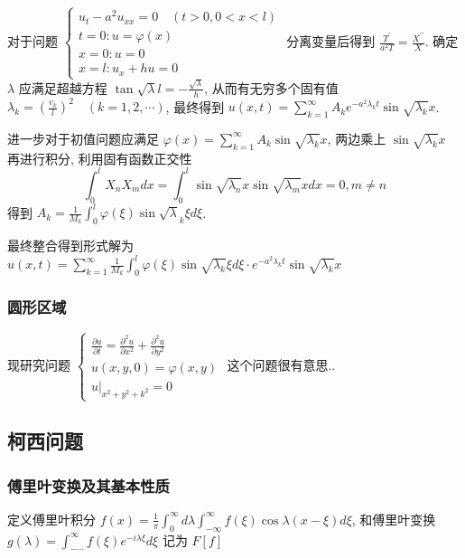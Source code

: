 \documentclass[10pt]{yerbaformat}
\begin{document}
\par 对于问题 $\left\{\begin{array}{l}u_{t}-a^{2} u_{x x}=0 \quad(t>0,0<x<l) \\ t=0: u=\varphi(x) \\ x=0: u=0 \\ x=l: u_{x}+h u=0\end{array}\right.$ 分离变量后得到 $\frac{T^{\prime}}{a^{2} T}=\frac{X^{\prime \prime}}{X}$. 确定 $\lambda$ 应满足超越方程 $\tan \sqrt{\lambda} l=-\frac{\sqrt{\lambda}}{h}$, 从而有无穷多个固有值 $\lambda_{k}=\left(\frac{v_{k}}{l}\right)^{2} \quad(k=1,2, \cdots)$, 最终得到 $u(x, t)=\sum_{k=1}^{\infty} A_{k} e^{-a^{2} \lambda_{k} t} \sin \sqrt{\lambda_{k}} x$.

\par 进一步对于初值问题应满足 $\varphi(x)=\sum_{k=1}^{\infty} A_{k} \sin \sqrt{\lambda_{k}} x$, 两边乘上 $\sin \sqrt{\lambda_{k}} x$ 再进行积分, 利用固有函数正交性 $$\int_{0}^{l} X_{n} X_{m} d x=\int_{0}^{l} \sin \sqrt{\lambda_{n}} x \sin \sqrt{\lambda_{m}} x d x=0, m \neq n$$ 得到 $A_{k}=\frac{1}{M_{k}} \int_{0}^{l} \varphi(\xi) \sin \sqrt{\lambda}_{k} \xi d \xi$.

\par 最终整合得到形式解为 $u(x, t)=\sum_{k=1}^{\infty} \frac{1}{M_{k}} \int_{0}^{l} \varphi(\xi) \sin \sqrt{\lambda_{k}} \xi d \xi \cdot e^{-a^{2} \lambda_{k} t} \sin \sqrt{\lambda_{k}} x$

\subsubsection{圆形区域}
\par 现研究问题 $\left\{\begin{array}{l}\frac{\partial u}{\partial t}=\frac{\partial^{2} u}{\partial x^{2}}+\frac{\partial^{2} u}{\partial y^{2}} \\ u(x, y, 0)=\varphi(x, y) \\ \left.u\right|_{x^{2}+y^{2}+k^{2}}=0\end{array}\right.$ 这个问题很有意思..

\subsection{柯西问题}
\subsubsection{傅里叶变换及其基本性质}

\par 定义傅里叶积分 $f(x)=\frac{1}{\pi} \int_{0}^{\infty} d \lambda \int_{-\infty}^{\infty} f(\xi) \cos \lambda(x-\xi) d \xi$, 和傅里叶变换 $g(\lambda)=\int_{-\cdots}^{\infty} f(\xi) e^{-i \lambda \xi} d \xi$ 记为 $F[f]$
\end{document}
